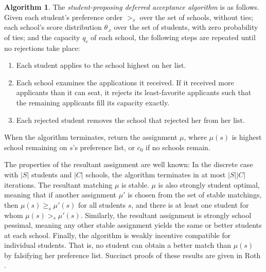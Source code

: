 \documentclass[12pt]{article}
\theoremstyle{definition}
\newtheorem{algorithm}{Algorithm}
\begin{document}
\begin{algorithm}
The \emph{student-proposing deferred acceptance algorithm} is as follows. Given each student's preference order $>_s$ over the set of schools, without ties;  each school's score distribution $\theta_{.c}$ over the set of students, with zero probability of ties; and the capacity $q_c$ of each school, the following steps are repeated until no rejections take place:
\begin{enumerate}
\item Each student applies to the school highest on her list.
\item Each school examines the applications it received. If it received more applicants than it can seat, it rejects its least-favorite applicants such that the remaining applicants fill its capacity exactly.
\item Each rejected student removes the school that rejected her from her list.
\end{enumerate}
When the algorithm terminates, return the assignment $\mu$, where $\mu(s)$ is highest school remaining on $s$'s preference list, or $c_0$ if no schools remain. 
\end{algorithm}
The properties of the resultant assignment are well known: In the discrete case with $|S|$ students and $|C|$ schools, the algorithm terminates in at most $|S||C|$ iterations. The resultant matching $\mu$ is stable. $\mu$ is also strongly student optimal, meaning that if another assignment $\mu'$ is chosen from the set of stable matchings, then $\mu(s) \geq_s \mu'(s)$ for all students $s$, and there is at least one student for whom $\mu(s) >_s \mu'(s)$. Similarly, the resultant assignment is strongly school pessimal, meaning any other stable assignment yields the same or better students at each school. Finally, the algorithm is weakly incentive compatible for individual students. That is, no student can obtain a better match than $\mu(s)$ by falsifying her preference list. Succinct proofs of these results are given in Roth \parencite*{economicsofmatching}.
\end{document}
